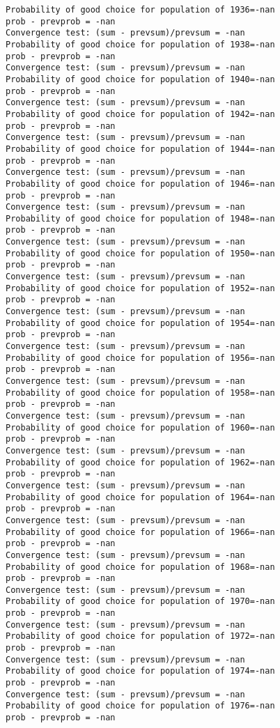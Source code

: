 \documentclass[11pt,onecolumn]{article}
\begin{document}
\begin{verbatim}
Probability of good choice for population of 1936=-nan
prob - prevprob = -nan
Convergence test: (sum - prevsum)/prevsum = -nan
Probability of good choice for population of 1938=-nan
prob - prevprob = -nan
Convergence test: (sum - prevsum)/prevsum = -nan
Probability of good choice for population of 1940=-nan
prob - prevprob = -nan
Convergence test: (sum - prevsum)/prevsum = -nan
Probability of good choice for population of 1942=-nan
prob - prevprob = -nan
Convergence test: (sum - prevsum)/prevsum = -nan
Probability of good choice for population of 1944=-nan
prob - prevprob = -nan
Convergence test: (sum - prevsum)/prevsum = -nan
Probability of good choice for population of 1946=-nan
prob - prevprob = -nan
Convergence test: (sum - prevsum)/prevsum = -nan
Probability of good choice for population of 1948=-nan
prob - prevprob = -nan
Convergence test: (sum - prevsum)/prevsum = -nan
Probability of good choice for population of 1950=-nan
prob - prevprob = -nan
Convergence test: (sum - prevsum)/prevsum = -nan
Probability of good choice for population of 1952=-nan
prob - prevprob = -nan
Convergence test: (sum - prevsum)/prevsum = -nan
Probability of good choice for population of 1954=-nan
prob - prevprob = -nan
Convergence test: (sum - prevsum)/prevsum = -nan
Probability of good choice for population of 1956=-nan
prob - prevprob = -nan
Convergence test: (sum - prevsum)/prevsum = -nan
Probability of good choice for population of 1958=-nan
prob - prevprob = -nan
Convergence test: (sum - prevsum)/prevsum = -nan
Probability of good choice for population of 1960=-nan
prob - prevprob = -nan
Convergence test: (sum - prevsum)/prevsum = -nan
Probability of good choice for population of 1962=-nan
prob - prevprob = -nan
Convergence test: (sum - prevsum)/prevsum = -nan
Probability of good choice for population of 1964=-nan
prob - prevprob = -nan
Convergence test: (sum - prevsum)/prevsum = -nan
Probability of good choice for population of 1966=-nan
prob - prevprob = -nan
Convergence test: (sum - prevsum)/prevsum = -nan
Probability of good choice for population of 1968=-nan
prob - prevprob = -nan
Convergence test: (sum - prevsum)/prevsum = -nan
Probability of good choice for population of 1970=-nan
prob - prevprob = -nan
Convergence test: (sum - prevsum)/prevsum = -nan
Probability of good choice for population of 1972=-nan
prob - prevprob = -nan
Convergence test: (sum - prevsum)/prevsum = -nan
Probability of good choice for population of 1974=-nan
prob - prevprob = -nan
Convergence test: (sum - prevsum)/prevsum = -nan
Probability of good choice for population of 1976=-nan
prob - prevprob = -nan

\end{verbatim}
\end{document}
